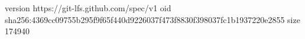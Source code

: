 version https://git-lfs.github.com/spec/v1
oid sha256:4369cc09755b295f9f65f440d9226037f473f8830f398037fc1b1937220e2855
size 174940
